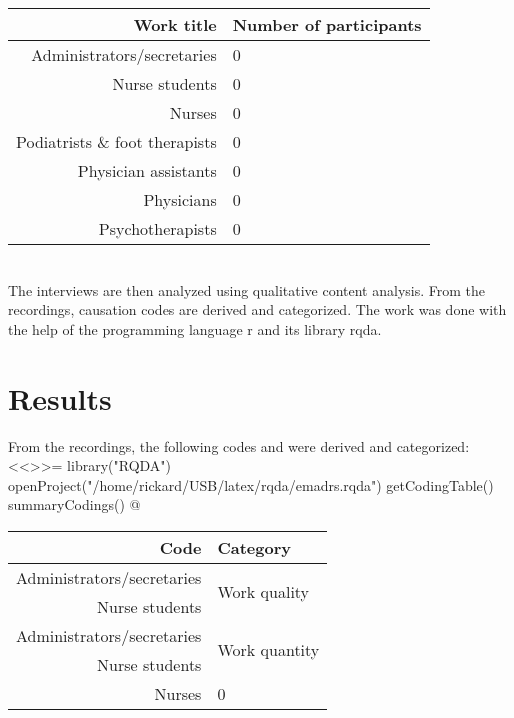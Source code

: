 \documentclass[12pt,a4paper,oneside]{article}
\renewcommand{\_}{\hspace{0.1cm}}
\let\oldcite\cite
\renewcommand*\cite[1]{\textsuperscript{\oldcite{#1}}}
\begin{document}
\begin{tabular}{r|l}
Work title & Number of participants\\
\hline
Administrators/secretaries & 0\\
Nurse students & 0\\
Nurses & 0\\
Podiatrists \& foot therapists & 0\\
Physician assistants & 0\\
Physicians & 0\\
Psychotherapists & 0\\
\hline
\end{tabular}\\
The interviews are then analyzed using qualitative content analysis\cite{analysis1}. From the recordings, causation codes are derived and categorized. The work was done with the help of the programming language {\sc r} and its library {\sc rqda}.

\section*{Results}
From the recordings, the following codes and  were derived and categorized:\\

<<>>=
library("RQDA")
openProject("/home/rickard/USB/latex/rqda/emadrs.rqda")
getCodingTable()
summaryCodings()
@

\begin{tabular}{r|l}
Code & Category\\
\hline
Administrators/secretaries & \multirow{ 2}{*}{Work quality}\\\cline{1-1}
Nurse students \\
\hline
Administrators/secretaries & \multirow{ 2}{*}{Work quantity}\\\cline{1-1}
Nurse students \\
\hline
Nurses & 0 \\
\hline
\end{tabular}
\end{document}
